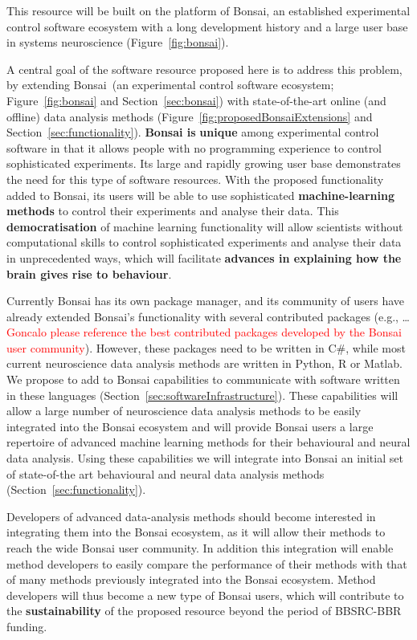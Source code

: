 \setcounter{figure}{1}

This resource will be built on the platform of Bonsai, an established experimental control software
ecosystem with a long development history and a large user base in systems neuroscience
(Figure~\ref{fig:bonsai}).

A central goal of the software resource proposed here is to address this
problem, by extending Bonsai~(an experimental control software ecosystem;
Figure~\ref{fig:bonsai} and Section~\ref{sec:bonsai}) with state-of-the-art
online (and offline) data analysis methods
(Figure~\ref{fig:proposedBonsaiExtensions} and
Section~\ref{sec:functionality}). \textbf{Bonsai is}
\textbf{unique} among experimental control software in that it allows people
with no programming experience to control sophisticated experiments. Its large
and rapidly growing user base demonstrates the need for this type of software
resources. With the proposed functionality added to Bonsai, its users
will be able to use sophisticated \textbf{machine-learning methods} to control their
experiments and analyse their data. This
\textbf{democratisation} of machine learning
functionality will allow scientists without computational skills to control
sophisticated experiments and analyse their data in unprecedented ways, which
will facilitate \textbf{advances in explaining how the brain gives rise to behaviour}.


Currently Bonsai has its own package manager, and its community of users have
already extended Bonsai's functionality with several contributed packages
(e.g., \ldots \textcolor{red}{Goncalo please reference the best contributed
packages developed by the Bonsai user community}). However, these packages need to
be written in C\#, while most current neuroscience data analysis methods are
written in Python, R or Matlab. We propose to add to Bonsai capabilities to
communicate with software written in these languages
(Section~\ref{sec:softwareInfrastructure}).  These capabilities will allow a
large number of neuroscience data analysis methods to be easily integrated into
the Bonsai ecosystem and will provide Bonsai users a large repertoire of
advanced machine learning methods for their behavioural and neural data
analysis.
%
Using these capabilities we will integrate into Bonsai an initial set of
state-of-the art behavioural and neural data analysis methods
(Section~\ref{sec:functionality}).

Developers of advanced data-analysis methods should become interested in
integrating them into the Bonsai ecosystem, as it will allow their methods to
reach the wide Bonsai user community. In addition this integration will enable
method developers to easily compare the performance of their methods with
that of many methods previously integrated into the Bonsai ecosystem. Method
developers will thus become a new type of Bonsai users, which will contribute
to the \textbf{sustainability} of the proposed resource beyond the period of
BBSRC-BBR funding.

